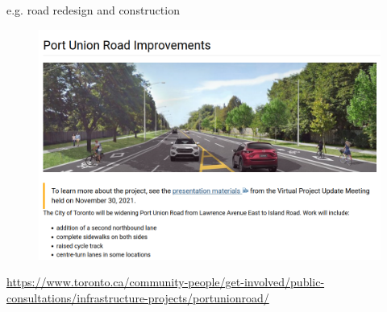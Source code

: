 \documentclass[aspectratio=169]{beamer}
\begin{document}
\begin{frame}
	e.g. road redesign and construction
	
	\begin{figure}
		\centering
		\includegraphics[width=0.7\linewidth]{images/port_union.png}
	\end{figure}
	
	\tiny\url{https://www.toronto.ca/community-people/get-involved/public-consultations/infrastructure-projects/portunionroad/}
\end{frame}
\end{document}
